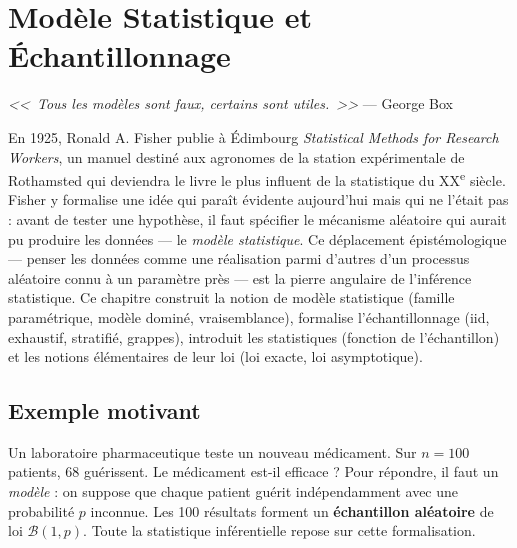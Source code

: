 \chapter{Mod\`ele Statistique et \'Echantillonnage}
\label{ch:modele}

\begin{center}
\textit{<<~Tous les mod\`eles sont faux, certains sont utiles.~>>} --- George Box
\end{center}

En 1925, Ronald A. Fisher publie à Édimbourg \emph{Statistical Methods for Research Workers}, un manuel destiné aux agronomes de la station expérimentale de Rothamsted qui deviendra le livre le plus influent de la statistique du XX\textsuperscript{e} siècle. Fisher y formalise une idée qui paraît évidente aujourd'hui mais qui ne l'était pas : avant de tester une hypothèse, il faut spécifier le mécanisme aléatoire qui aurait pu produire les données --- le \emph{modèle statistique}. Ce déplacement épistémologique --- penser les données comme une réalisation parmi d'autres d'un processus aléatoire connu à un paramètre près --- est la pierre angulaire de l'inférence statistique. Ce chapitre construit la notion de modèle statistique (famille paramétrique, modèle dominé, vraisemblance), formalise l'échantillonnage (iid, exhaustif, stratifié, grappes), introduit les statistiques (fonction de l'échantillon) et les notions élémentaires de leur loi (loi exacte, loi asymptotique).

\section{Exemple motivant}

Un laboratoire pharmaceutique teste un nouveau m\'edicament. Sur $n=100$ patients, 68 gu\'erissent. Le m\'edicament est-il efficace ? Pour r\'epondre, il faut un \emph{mod\`ele} : on suppose que chaque patient gu\'erit ind\'ependamment avec une probabilit\'e $p$ inconnue. Les 100 r\'esultats forment un \textbf{\'echantillon al\'eatoire} de loi $\mathcal{B}(1,p)$. Toute la statistique inf\'erentielle repose sur cette formalisation.

